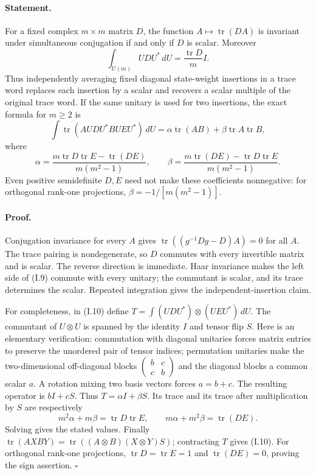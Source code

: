 \documentclass[11pt,a4paper]{article}
\theoremstyle{definition}\newtheorem{definition}{Definition}
\begin{document}
\paragraph{Statement.}
For a fixed complex $m\times m$ matrix $D$, the function
$A\mapsto\operatorname{tr}(DA)$ is invariant under simultaneous
conjugation if and only if $D$ is scalar.  Moreover
\[
 \int_{U(m)}UDU^*\,dU=\frac{\operatorname{tr}D}{m}I.
\tag{I.9}
\]
Thus independently averaging fixed diagonal state-weight insertions
in a trace word replaces each insertion by a scalar and recovers
a scalar multiple of the original trace word.  If the same unitary
is used for two insertions, the exact formula for $m\ge2$ is
\[
 \int\operatorname{tr}(A UDU^* B UEU^*)\,dU
 =\alpha\operatorname{tr}(AB)+\beta\operatorname{tr}A\operatorname{tr}B,
\tag{I.10}
\]
where
\[
 \alpha=\frac{m\operatorname{tr}D\operatorname{tr}E-
                    \operatorname{tr}(DE)}{m(m^2-1)},\qquad
 \beta=\frac{m\operatorname{tr}(DE)-
                    \operatorname{tr}D\operatorname{tr}E}{m(m^2-1)}.
\]
Even positive semidefinite $D,E$ need not make these coefficients
nonnegative: for orthogonal rank-one projections,
$\beta=-1/[m(m^2-1)]$.

\paragraph{Proof.}
Conjugation invariance for every $A$ gives
$\operatorname{tr}((g^{-1}Dg-D)A)=0$ for all $A$.  The trace pairing
is nondegenerate, so $D$ commutes with every invertible matrix and
is scalar.  The reverse direction is immediate.  Haar invariance
makes the left side of (I.9) commute with every unitary; the
commutant is scalar, and its trace determines the scalar.  Repeated
integration gives the independent-insertion claim.

For completeness, in (I.10) define
$T=\int(UDU^*)\otimes(UEU^*)\,dU$.  The commutant of
$U\otimes U$ is spanned by the identity $I$ and tensor flip $S$.
Here is an elementary verification: commutation with diagonal unitaries
forces matrix entries to preserve the unordered pair of tensor indices;
permutation unitaries make the two-dimensional off-diagonal blocks
$\left(\begin{smallmatrix}b&c\\c&b\end{smallmatrix}\right)$ and
the diagonal blocks a common scalar $a$.  A rotation mixing two basis
vectors forces $a=b+c$.  The resulting operator is $bI+cS$.
Thus $T=\alpha I+\beta S$.  Its trace and its trace after multiplication
by $S$ are respectively
\[
 m^2\alpha+m\beta=\operatorname{tr}D\operatorname{tr}E,
 \qquad m\alpha+m^2\beta=\operatorname{tr}(DE).
\]
Solving gives the stated values.  Finally
$\operatorname{tr}(A X B Y)=
\operatorname{tr}((A\otimes B)(X\otimes Y)S)$;
contracting $T$ gives (I.10).  For orthogonal rank-one projections,
$\operatorname{tr}D=\operatorname{tr}E=1$ and
$\operatorname{tr}(DE)=0$, proving the sign assertion.
\hfill$\square$
\end{document}
